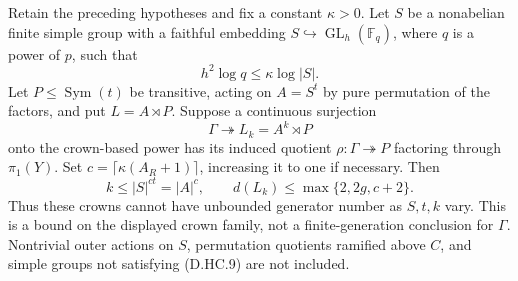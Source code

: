 \begin{theorem}
\label{D:unramified-permutation-linear-crowns}
Retain the preceding hypotheses and fix a constant $\kappa>0$.
Let $S$ be a nonabelian finite simple group with a faithful
embedding $S\hookrightarrow\operatorname{GL}_h(\mathbb F_q)$,
where $q$ is a power of $p$, such that
\[
                      h^2\log q\leq\kappa\log|S|.       \tag{D.HC.9}
\]
Let $P\leq\operatorname{Sym}(t)$ be transitive, acting on
$A=S^t$ by pure permutation of the factors, and put
$L=A\rtimes P$. Suppose a continuous surjection
\[
               \Gamma\twoheadrightarrow L_k
                   = A^k\rtimes P                      \tag{D.HC.10}
\]
onto the crown-based power has its induced quotient
$\rho:\Gamma\twoheadrightarrow P$ factoring through
$\pi_1(Y)$. Set $c=\lceil\kappa(A_R+1)\rceil$, increasing
it to one if necessary. Then
\[
             k\leq |S|^{ct}=|A|^c,
          \qquad d(L_k)\leq\max\{2,2g,c+2\}.           \tag{D.HC.11}
\]
Thus these crowns cannot have unbounded generator number
as $S,t,k$ vary. This is a bound on the displayed crown
family, not a finite-generation conclusion for $\Gamma$.
Nontrivial outer actions on $S$, permutation quotients
ramified above $C$, and simple groups not satisfying
(D.HC.9) are not included.
\end{theorem}

